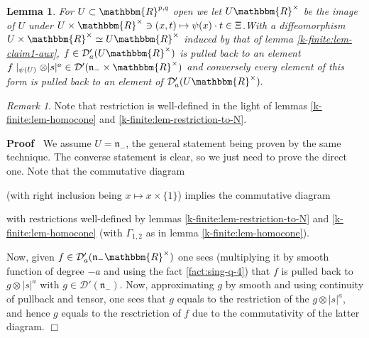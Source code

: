 \documentclass{article}
\renewenvironment{proof}{\noindent\textbf{Proof\ }}{\hspace*{\fill}$\Box$\medskip}
\newtheorem{lemma}[proposition]{Lemma}
\theoremstyle{remark}
\newtheorem{remark}[proposition]{Remark}
\newcommand{\C}{\ensuremath{\mathbbm{C}}}
\begin{document}
\begin{lemma}
  \label{k-finite:lem-claim1-aux-2} For $U \subset \mathbbm{R}^{p, q}$ open we
  let $U\mathbbm{R}^{\times}$ be the image of $U$ under $U \times
  \mathbbm{R}^{\times} \ni (x, t) \mapsto \psi (x) \cdot t \in \Xi$.With a
  diffeomorphism $U \times \mathbbm{R}^{\times} \simeq U\mathbbm{R}^{\times}$
  induced by that of lemma \ref{k-finite:lem-claim1-aux}, $f \in
  \mathcal{D}'_a (U\mathbbm{R}^{\times})$ is pulled back to an element $f
  \mid_{\psi (U)} \otimes | s |^a \in \mathcal{D}' (\mathfrak{n}_- \times
  \mathbbm{R}^{\times})$ and conversely every element of this form is pulled
  back to an element of $\mathcal{D}'_a (U\mathbbm{R}^{\times}) .$
\end{lemma}

\begin{remark}
  Note that restriction is well-defined in the light of lemmas
  \ref{k-finite:lem-homocone} and \ref{k-finite:lem-restriction-to-N}.
\end{remark}

\begin{proof}
  We assume $U =\mathfrak{n}_-$, the general statement being proven by the
  same technique. The converse statement is clear, so we just need to prove
  the direct one. Note that the commutative diagram
  
  \centerline{ }%
  
  (with right inclusion being $x \mapsto x \times \{ 1 \}$) implies the
  commutative diagram
  
  \centerline{ }%
  
  with restrictions well-defined by lemmas \ref{k-finite:lem-restriction-to-N}
  and \ref{k-finite:lem-homocone} (with $\Gamma_{1, 2}$ as in lemma
  \ref{k-finite:lem-homocone}).
  
  Now, given $f \in \mathcal{D}'_a (\mathfrak{n}_- \mathbbm{R}^{\times})$ one
  sees (multiplying it by smooth function of degree $- a$ and using the fact
  \ref{fact:sing-q-4}) that $f$ is pulled back to $g \otimes | s |^a$ with $g
  \in \mathcal{D}' (\mathfrak{n}_-)$. Now, approximating $g$ by smooth and
  using continuity of pullback and tensor, one sees that $g$ equals to the
  restriction of the $g \otimes | s |^a$, and hence $g$ equals to the
  resctriction of $f$ due to the commutativity of the latter diagram.
\end{proof}
\end{document}
